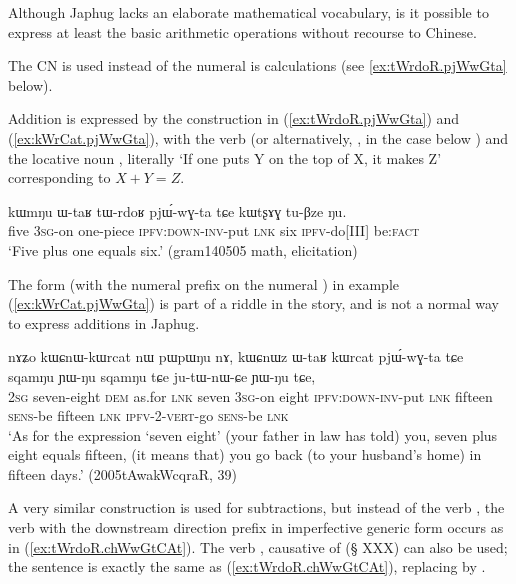 {Although Japhug lacks an elaborate mathematical vocabulary, is it possible to express at least the basic arithmetic operations without recourse to Chinese. 

The CN  is used instead of the numeral  is calculations (see \ref{ex:tWrdoR.pjWwGta} below).

Addition is expressed by the construction in (\ref{ex:tWrdoR.pjWwGta}) and (\ref{ex:kWrCat.pjWwGta}), with the verb  (or alternatively, , in the case below ) and the locative noun , literally  `If one puts Y on the top of X, it makes Z' corresponding to $X+Y=Z$.  

\begin{exe}
\ex \label{ex:tWrdoR.pjWwGta}
 \gll kɯmŋu ɯ-taʁ tɯ-rdoʁ pjɯ́-wɣ-ta tɕe kɯtʂɤɣ tu-βze ŋu.  \\
 five \textsc{3sg}-on one-piece \textsc{ipfv}:\textsc{down}-\textsc{inv}-put \textsc{lnk} six \textsc{ipfv}-do[III] be:\textsc{fact} \\
 \glt `Five plus one equals six.' (gram140505 math, elicitation)
\end{exe}

The form  (with the numeral prefix  on the numeral ) in example (\ref{ex:kWrCat.pjWwGta}) is part of a riddle in the story, and is not a normal way to express additions in Japhug.

\begin{exe}
\ex \label{ex:kWrCat.pjWwGta}
 \gll  nɤʑo kɯɕnɯ-kɯrcat nɯ pɯpɯŋu nɤ, kɯɕnɯz ɯ-taʁ kɯrcat pjɯ́-wɣ-ta tɕe sqamŋu ɲɯ-ŋu sqamŋu tɕe ju-tɯ-nɯ-ɕe ɲɯ-ŋu tɕe, \\
 \textsc{2sg} seven-eight \textsc{dem} as.for \textsc{lnk} seven  \textsc{3sg}-on eight \textsc{ipfv}:\textsc{down}-\textsc{inv}-put \textsc{lnk}  fifteen   \textsc{sens}-be fifteen \textsc{lnk} \textsc{ipfv}-2-\textsc{vert}-go \textsc{sens}-be \textsc{lnk} \\
\glt `As for the expression `seven eight' (your father in law has told) you, seven plus eight equals fifteen, (it means that) you go back (to your husband's home) in fifteen days.' (2005tAwakWcqraR, 39)
\end{exe}

A very similar construction is used for subtractions, but instead of the verb  , the verb  with the downstream direction prefix in imperfective generic form  occurs as in (\ref{ex:tWrdoR.chWwGtCAt}). The verb , causative of  (§ XXX) can also be used; the sentence is exactly the same as (\ref{ex:tWrdoR.chWwGtCAt}), replacing   by  .

}
